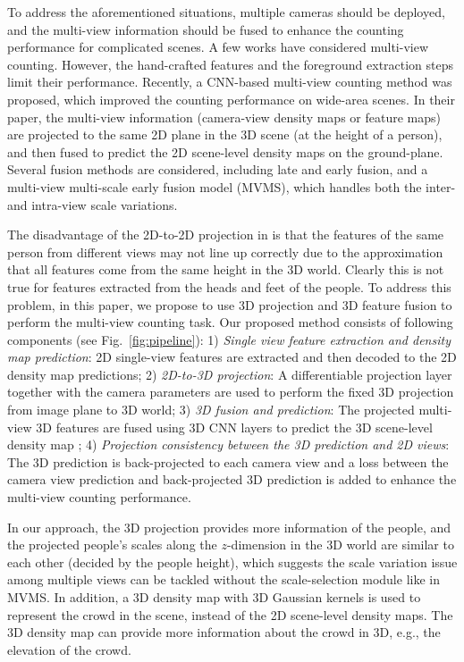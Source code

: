 \documentclass[letterpaper]{article}
\newcommand{\CUT}[1]{}
\newcommand{\citep}{\cite}
\begin{document}
To address the aforementioned situations, multiple cameras should be deployed, and the multi-view information should be fused to enhance the counting performance for complicated scenes. A few works \citep{li2012people,Ryan2014Scene,Tang2014Cross,Ge2010Crowd} have considered multi-view counting. However, the hand-crafted features and the foreground extraction steps limit their performance. %
Recently, a CNN-based multi-view counting method \citep{zhang2019wide} was proposed, which improved the counting performance on wide-area scenes.
In their paper, the multi-view information (camera-view density maps or feature maps) are projected to the same 2D plane in the 3D scene (at the height of a person), and then fused to predict the 2D scene-level density maps on the ground-plane. Several fusion methods are considered, including late and early fusion, and a multi-view multi-scale early fusion model (MVMS), which handles both the inter- and intra-view scale variations.

The disadvantage of the 2D-to-2D projection in \citep{zhang2019wide} is that the features of the same person from different views may not line up correctly due to the approximation that all features come from the same height in the 3D world. Clearly this is not true for features extracted from the heads and feet of the people.
To address this problem,
in this paper,
we propose to use 3D projection and 3D feature fusion to perform the multi-view counting task. Our proposed method consists of following components (see Fig.~\ref{fig:pipeline}): 1) \emph{Single view feature extraction and density map prediction}: 2D single-view features are extracted and then decoded to the 2D density map predictions; 2) \emph{2D-to-3D projection}: A differentiable projection layer together with the camera parameters are used to perform the fixed 3D projection from image plane to 3D world; 3) \emph{3D fusion and prediction}: The projected multi-view 3D features are fused using 3D CNN layers to predict the 3D scene-level density map \CUT{and $z$-dim full-size 3D filters are adopted to handle the scale variation issue}; 4) \emph{Projection consistency between the 3D prediction and 2D views}: The 3D prediction is back-projected to each camera view and a loss between the camera view prediction and back-projected 3D prediction is added to enhance the multi-view counting performance.

In our approach, the 3D projection provides more information of the people, and the projected people's scales along the $z$-dimension in the 3D world are similar to each other (decided by the people height), which suggests the scale variation issue among multiple views can be tackled without the scale-selection module like in MVMS. In addition, a 3D density map with 3D Gaussian kernels is used to represent the crowd in the scene, instead of the 2D scene-level density maps. The 3D density map can provide more information about the crowd in 3D, e.g., the elevation of the crowd. %
\CUT{The prediction of the 3D density map is also used as an %
intermediate representation to enforce the projection consistency across the camera views, which can further improve the multi-view counting performance.
}
\end{document}
